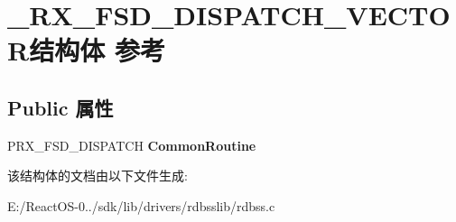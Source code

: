 \hypertarget{struct___r_x___f_s_d___d_i_s_p_a_t_c_h___v_e_c_t_o_r}{}\section{\+\_\+\+R\+X\+\_\+\+F\+S\+D\+\_\+\+D\+I\+S\+P\+A\+T\+C\+H\+\_\+\+V\+E\+C\+T\+O\+R结构体 参考}
\label{struct___r_x___f_s_d___d_i_s_p_a_t_c_h___v_e_c_t_o_r}
\subsection*{Public 属性}
\begin{DoxyCompactItemize}
\item 
\mbox{\label{struct___r_x___f_s_d___d_i_s_p_a_t_c_h___v_e_c_t_o_r_a3eed9de0861be40a938ecaffb69ad1a4}} 
P\+R\+X\+\_\+\+F\+S\+D\+\_\+\+D\+I\+S\+P\+A\+T\+CH {\bfseries Common\+Routine}
\end{DoxyCompactItemize}


该结构体的文档由以下文件生成\+:\begin{DoxyCompactItemize}
\item 
E\+:/\+React\+O\+S-\/0../sdk/lib/drivers/rdbsslib/rdbss.\+c\end{DoxyCompactItemize}
